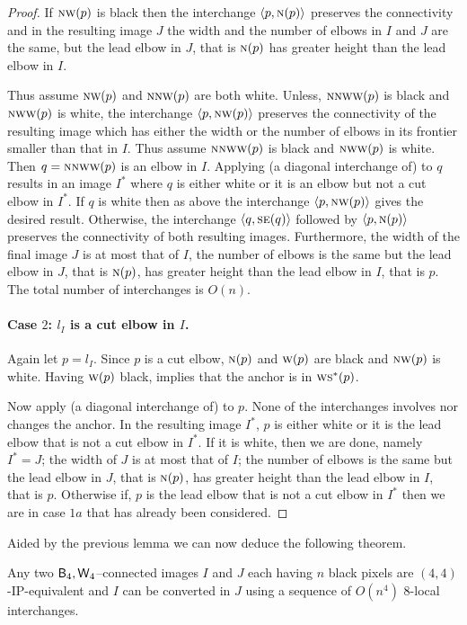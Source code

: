 \documentclass[lotsofwhite,charterfonts]{patmorin}
\newcommand{\fourfour}{\ensuremath{\protect\textup{\textsf{B}}_{4},\protect\textup{\textsf{W}}_{4}}}
\newcommand{\N}{\textsc{n}}
\newcommand{\SE}{\textsc{se}}
\renewcommand{\S}{\textsc{s}}
\newcommand{\W}{\textsc{w}}
\newcommand{\NW}{\textsc{nw}}
\newcommand{\ic}[2]{\langle #1,#2 \rangle}
\begin{document}
\begin{proof}
If $\NW(p)$ is black then the interchange $\ic{p}{\N(p)}$ preserves
the connectivity and in the resulting image $J$ the width and the
number of elbows in $I$ and $J$ are the same, but the lead elbow in
$J$, that is $\N(p)$ has greater height than the  lead elbow in $I$. 

Thus assume $\NW(p)$ and $\N\NW(p)$ are both white. Unless,
$\N\NW\W(p)$ is black and $\NW\W(p)$ is white, the interchange
$\ic{p}{\NW(p)}$ preserves the connectivity of the resulting image
which has either the width or the number of elbows in its frontier
smaller than that in $I$. Thus assume $\N\NW\W(p)$ is black and
$\NW\W(p)$ is white. Then $q=\N\NW\W(p)$ is an elbow in $I$. Applying
(a diagonal interchange of)  to $q$ results in an
image $I^*$ where $q$ is either white or it is an elbow but not a cut
elbow in $I^*$. If $q$ is white then as above the interchange
$\ic{p}{\NW(p)}$ gives the desired result. Otherwise, the interchange
$\ic{q}{\SE(q)}$ followed by $\ic{p}{\N(p)}$ preserves the
connectivity of both resulting images. Furthermore, the width of the
final image $J$ is at most that of $I$, the number of elbows is the
same but the lead elbow in $J$, that is $\N(p)$, has greater height
than the lead elbow in $I$, that is $p$. The total number of
interchanges is $O(n)$.

\paragraph{Case $2$: $l_I$ is a cut elbow in $I$.} Again let $p=l_I$.
Since $p$ is a cut elbow, $\N(p)$ and $\W(p)$ are black and $\NW(p)$
is white. Having $\W(p)$ black, implies that the anchor is in
$\W\S^*(p)$. 

Now apply (a diagonal interchange of)  to $p$. None
of the interchanges involves nor changes the anchor. In the resulting
image $I^*$, $p$ is either white or it is the lead elbow that is not a
cut elbow in $I^*$. If it is white, then we are done, namely $I^*=J$;
the width of $J$ is at most that of $I$; the number of elbows is the
same but the lead elbow in $J$, that is $\N(p)$, has greater height
than the lead elbow in $I$, that is $p$. Otherwise if, $p$ is the lead
elbow that is not a cut elbow in $I^*$ then we are in case $1a$ that
has already been considered.  \end{proof}

Aided by the previous lemma we can now deduce the following theorem.

\begin{thm}
Any two \fourfour--connected images $I$ and $J$ each having $n$ black
pixels are $(4,4)$-IP-equivalent and $I$ can be converted in $J$ using a
sequence of $O(n^4)$ 8-local interchanges.
\end{thm}
\end{document}
